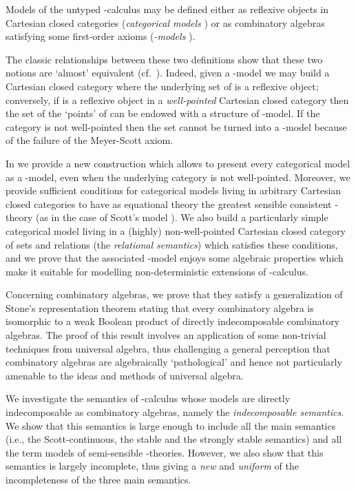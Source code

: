 \documentclass[english]{llncs}
\begin{document}
Models of the untyped -calculus may be defined either as reflexive objects in Cartesian closed categories ({\em categorical models} \cite[Sec.~5.5]{Bare})
or as combinatory algebras satisfying some first-order axioms ({\em -models} \cite[Sec.~5.2]{Bare}).

The classic relationships between these two definitions show that these two notions are `almost' equivalent (cf.\  \cite[Ch.~5]{Bare}).
Indeed, given a -model  we may build a Cartesian closed category where the underlying set of   is a reflexive object;
conversely, if   is a reflexive object in a {\em well-pointed} Cartesian closed category  then the set  of the `points' of  can be endowed with a structure of -model.
If the category is not well-pointed then the set  cannot be turned into a -model because of the failure of the Meyer-Scott axiom.

In \cite{ManzonettoTh} we provide a new construction which allows to present every categorical model as a -model, even when the underlying category is not well-pointed.
Moreover, we provide sufficient conditions for categorical models living in arbitrary Cartesian closed categories to have as equational theory the greatest sensible consistent -theory  (as in the case of Scott's model ).
We also build a particularly simple categorical model living in a (highly) non-well-pointed Cartesian closed category of sets and relations (the {\em relational semantics}) 
which satisfies these conditions, and we prove that the associated -model enjoys some algebraic properties which make it suitable for modelling 
non-deterministic extensions of -calculus.

Concerning combinatory algebras, we prove that they satisfy a generalization of Stone's representation theorem stating that every combinatory algebra is 
isomorphic to a weak Boolean product of directly indecomposable combinatory algebras.
The proof of this result involves an application of some non-trivial techniques from universal algebra, thus challenging a general perception that combinatory algebras are 
algebraically `pathological' and hence not particularly amenable to the ideas and methods of universal algebra.

We investigate the semantics of -calculus whose models are directly indecomposable as combinatory algebras, namely the {\em indecomposable semantics}. We show that 
this semantics is large enough to include all the main semantics (i.e., the Scott-continuous, the stable and the strongly stable semantics) and all the term models of semi-sensible -theories. However, we also show that this semantics is largely incomplete, thus giving a {\em new} and {\em uniform} of the incompleteness of the three main semantics.
\end{document}
